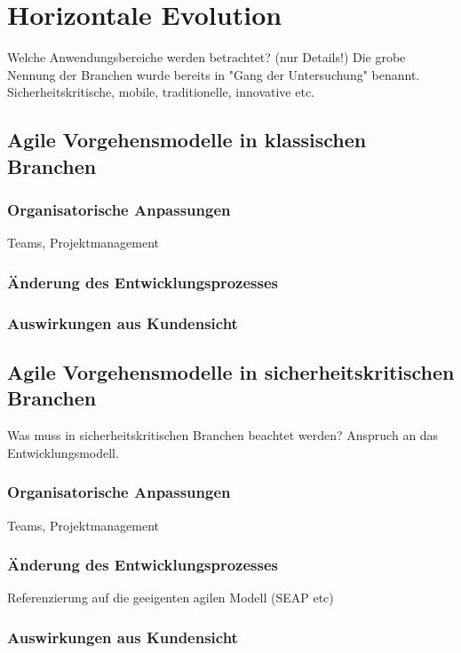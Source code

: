 \chapter{Horizontale Evolution} %

Welche Anwendungsbereiche werden betrachtet? (nur Details!)
Die grobe Nennung der Branchen wurde bereits in "Gang der Untersuchung" benannt.
Sicherheitskritische, mobile, traditionelle, innovative etc.

\section{Agile Vorgehensmodelle in klassischen Branchen}

\subsection{Organisatorische Anpassungen}

Teams, Projektmanagement

\subsection{Änderung des Entwicklungsprozesses}

\subsection{Auswirkungen aus Kundensicht}


\section{Agile Vorgehensmodelle in sicherheitskritischen Branchen}

Was muss in sicherheitskritischen Branchen beachtet werden?
Anspruch an das Entwicklungsmodell.

\subsection{Organisatorische Anpassungen}

Teams, Projektmanagement

\subsection{Änderung des Entwicklungsprozesses}

Referenzierung auf die geeigenten agilen Modell (SEAP etc)

\subsection{Auswirkungen aus Kundensicht}




